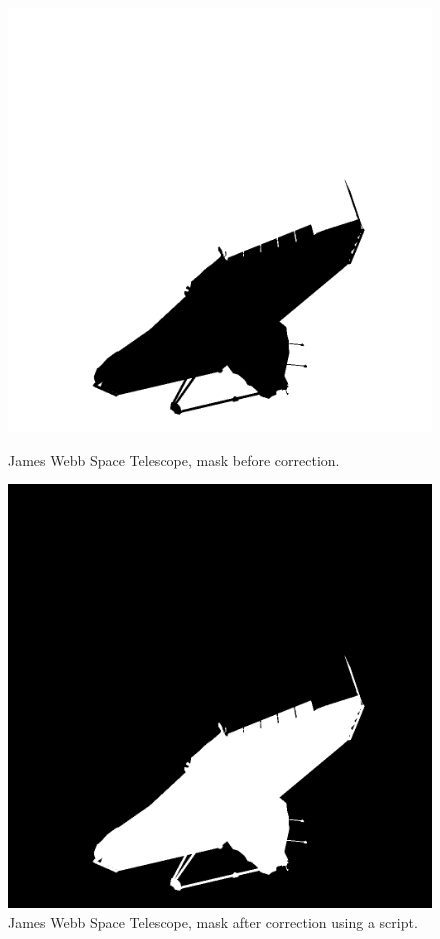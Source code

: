 \begin{figure}[h]
    \centering
    \begin{minipage}{0.45\linewidth}
        \centering
        \includegraphics[width=\linewidth]{data/mask1.png} %
        \caption{James Webb Space Telescope, mask before correction.}
        \label{fig:mask1}
    \end{minipage}\hfill
    \begin{minipage}{0.45\linewidth}
        \centering
        \includegraphics[width=\linewidth]{data/mask2.png} %
        \caption{James Webb Space Telescope, mask after correction using a script.}
        \label{fig:mask2}
    \end{minipage}
\end{figure}
\bigskip


